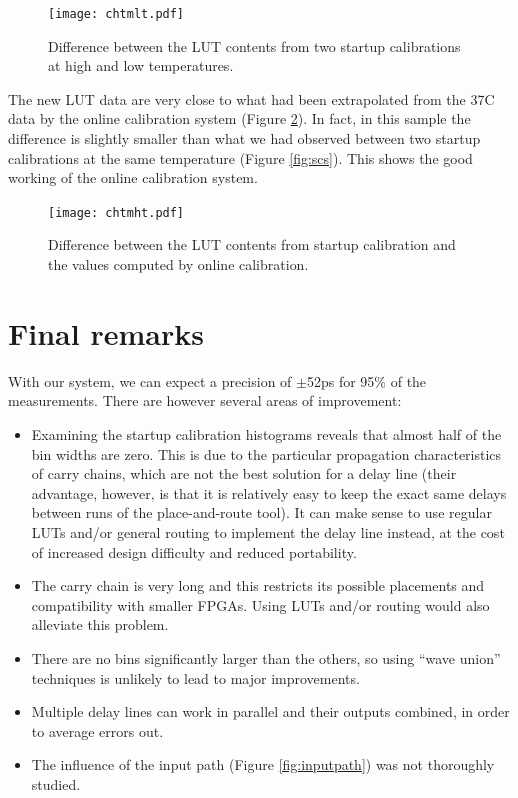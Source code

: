 \documentclass[a4paper,11pt]{article}
\begin{document}
\begin{figure}[H]
\texttt{[image: chtmlt.pdf]}
\caption{Difference between the LUT contents from two startup calibrations at high and low temperatures.}
\label{fig:chtmlt}
\end{figure}

The new LUT data are very close to what had been extrapolated from the 37\degree C data by the online calibration system (Figure \ref{fig:chtmht}). In fact, in this sample the difference is slightly smaller than what we had observed between two startup calibrations at the same temperature (Figure \ref{fig:scs}). This shows the good working of the online calibration system.

\begin{figure}[H]
\texttt{[image: chtmht.pdf]}
\caption{Difference between the LUT contents from startup calibration and the values computed by online calibration.}
\label{fig:chtmht}
\end{figure}

\section{Final remarks}
With our system, we can expect a precision of $\pm$52ps for 95\% of the measurements. There are however several areas of improvement:
\begin{itemize}
\item Examining the startup calibration histograms reveals that almost half of the bin widths are zero. This is due to the particular propagation characteristics of carry chains, which are not the best solution for a delay line (their advantage, however, is that it is relatively easy to keep the exact same delays between runs of the place-and-route tool). It can make sense to use regular LUTs and/or general routing to implement the delay line instead, at the cost of increased design difficulty and reduced portability.
\item The carry chain is very long and this restricts its possible placements and compatibility with smaller FPGAs. Using LUTs and/or routing would also alleviate this problem.
\item There are no bins significantly larger than the others, so using ``wave union'' techniques is unlikely to lead to major improvements.
\item Multiple delay lines can work in parallel and their outputs combined, in order to average errors out.
\item The influence of the input path (Figure \ref{fig:inputpath}) was not thoroughly studied.
\end{itemize}
\end{document}
